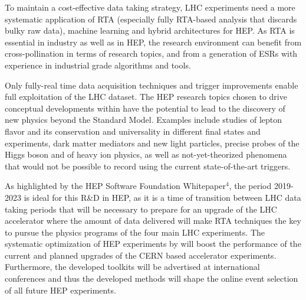 To maintain a cost-effective data taking strategy, LHC experiments need a more systematic application of RTA (especially fully RTA-based analysis that discards bulky raw data), machine learning and hybrid architectures for HEP. 
As RTA is essential in industry as well as in HEP, the research environment can benefit from cross-pollination in terms of research topics, and from a generation of ESRs with experience in industrial grade algorithms and tools. 

\noindent {\color{blue}{2. The \acronym research program could lead to breakthroughs in our understanding of nature}}
Only fully-real time data acquisition techniques and trigger improvements enable full exploitation of the LHC dataset. 
The HEP research topics chosen to drive conceptual developments within \acronym have the potential to lead to the discovery of new physics beyond the Standard Model. 
Examples include studies of lepton flavor and its conservation and universality in different final states and experiments, dark matter mediators and new light particles, precise probes of the Higgs boson and of heavy ion physics, as well as not-yet-theorized phenomena that would not be possible to record using the current state-of-the-art triggers. 

As highlighted by the HEP Software Foundation Whitepaper$^{4}$, the period 2019-2023 is ideal for this R\&D in HEP, as it is a time of transition between LHC data taking periods that will be necessary to prepare for an upgrade of the LHC accelerator where the amount of data delivered will make RTA techniques the key to pursue the physics programs of the four main LHC experiments.
The systematic optimization of HEP experiments by \acronym will boost the performance of the current and planned upgrades of the CERN based accelerator experiments.
Furthermore, the developed toolkits will be advertised at international conferences and thus the developed methods will shape the online event selection of all future HEP experiments. 

